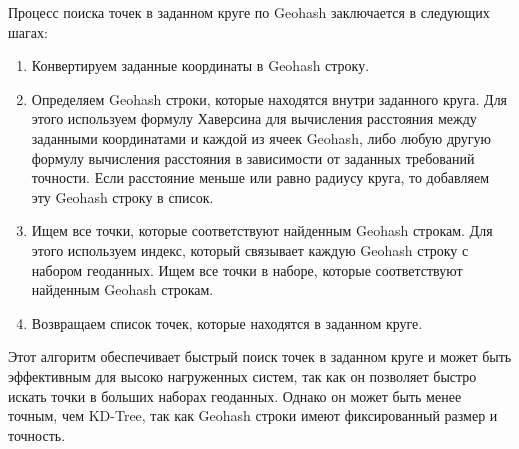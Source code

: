Процесс поиска точек в заданном круге по Geohash заключается в следующих шагах:
\begin{enumerate}
    \item Конвертируем заданные координаты в Geohash строку.
    \item Определяем Geohash строки, которые находятся внутри заданного круга. Для этого используем формулу Хаверсина для вычисления расстояния между заданными координатами и каждой из ячеек Geohash, либо любую другую формулу вычисления расстояния в зависимости от заданных требований точности. Если расстояние меньше или равно радиусу круга, то добавляем эту Geohash строку в список.
    \item Ищем все точки, которые соответствуют найденным Geohash строкам. Для этого используем индекс, который связывает каждую Geohash строку с набором геоданных. Ищем все точки в наборе, которые соответствуют найденным Geohash строкам.
    \item Возвращаем список точек, которые находятся в заданном круге.
\end{enumerate}

Этот алгоритм обеспечивает быстрый поиск точек в заданном круге и может быть эффективным для высоко нагруженных систем, так как он позволяет быстро искать точки в больших наборах геоданных. Однако он может быть менее точным, чем KD-Tree, так как Geohash строки имеют фиксированный размер и точность.

